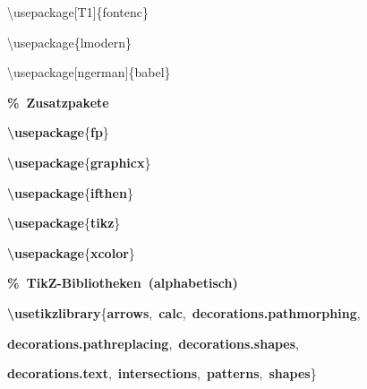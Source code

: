 {{\rule[-0.5ex]{0pt}{2.5ex}\hspace*{0.0em}\textbackslash{}usepackage[T1]\{fontenc\}\\
\rule[-0.5ex]{0pt}{2.5ex}\hspace*{0.0em}\textbackslash{}usepackage\{lmodern\}\\
\rule[-0.5ex]{0pt}{2.5ex}\hspace*{0.0em}\textbackslash{}usepackage[ngerman]\{babel\}\\
\rule[-0.5ex]{0pt}{2.5ex}\hspace*{0.0em}\textcolor{G}{\textbf{\%~Zusatzpakete}}\\
\rule[-0.5ex]{0pt}{2.5ex}\hspace*{0.0em}\textcolor{R}{\textbf{\textbackslash{}usepackage}}\{\textcolor{R}{\textbf{fp}}\}\\
\rule[-0.5ex]{0pt}{2.5ex}\hspace*{0.0em}\textcolor{R}{\textbf{\textbackslash{}usepackage}}\{\textcolor{R}{\textbf{graphicx}}\}\\
\rule[-0.5ex]{0pt}{2.5ex}\hspace*{0.0em}\textcolor{R}{\textbf{\textbackslash{}usepackage}}\{\textcolor{R}{\textbf{ifthen}}\}\\
\rule[-0.5ex]{0pt}{2.5ex}\hspace*{0.0em}\textcolor{R}{\textbf{\textbackslash{}usepackage}}\{\textcolor{R}{\textbf{tikz}}\}\\
\rule[-0.5ex]{0pt}{2.5ex}\hspace*{0.0em}\textcolor{R}{\textbf{\textbackslash{}usepackage}}\{\textcolor{R}{\textbf{xcolor}}\}\\
\rule[-0.5ex]{0pt}{2.5ex}\hspace*{0.0em}\textcolor{G}{\textbf{\%~TikZ{-}Bibliotheken~(alphabetisch)}}\\
\rule[-0.5ex]{0pt}{2.5ex}\hspace*{0.0em}\textcolor{R}{\textbf{\textbackslash{}usetikzlibrary}}\{\textcolor{R}{\textbf{arrows}},~\textcolor{R}{\textbf{calc}},~\textcolor{R}{\textbf{decorations.pathmorphing}},\\
\rule[-0.5ex]{0pt}{2.5ex}\hspace*{8.0em}\textcolor{R}{\textbf{decorations.pathreplacing}},~\textcolor{R}{\textbf{decorations.shapes}},\\
\rule[-0.5ex]{0pt}{2.5ex}\hspace*{8.0em}\textcolor{R}{\textbf{decorations.text}},~\textcolor{R}{\textbf{intersections}},~\textcolor{R}{\textbf{patterns}},~\textcolor{R}{\textbf{shapes}}\}}%
}%
\endgroup
